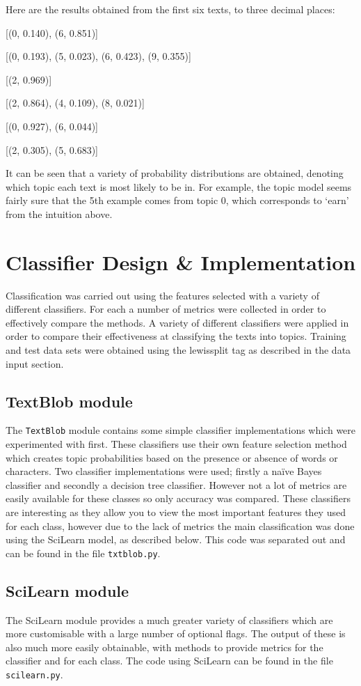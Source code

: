 \documentclass{article}
\begin{document}
Here are the results obtained from the first six texts, to three decimal places:

[(0, 0.140), (6, 0.851)]

[(0, 0.193), (5, 0.023), (6, 0.423), (9, 0.355)]

[(2, 0.969)]

[(2, 0.864), (4, 0.109), (8, 0.021)]

[(0, 0.927), (6, 0.044)]

[(2, 0.305), (5, 0.683)]

It can be seen that a variety of probability distributions are obtained, denoting which topic each text is most likely to be in. For example, the topic model seems fairly sure that the 5th example comes from topic 0, which corresponds to `earn' from the intuition above.

\section{Classifier Design \& Implementation}
Classification was carried out using the features selected with a variety of different classifiers. For each a number of metrics were collected in order to effectively compare the methods. A variety of different classifiers were applied in order to compare their effectiveness at classifying the texts into topics. Training and test data sets were obtained using the lewissplit tag as described in the data input section.

\subsection{TextBlob module}
The \verb|TextBlob| module contains some simple classifier implementations which were experimented with first. These classifiers use their own feature selection method which creates topic probabilities based on the presence or absence of words or characters. Two classifier implementations were used; firstly a na{\"i}ve Bayes classifier and secondly a decision tree classifier. However not a lot of metrics are easily available for these classes so only accuracy was compared. These classifiers are interesting as they allow you to view the most important features they used for each class, however due to the lack of metrics the main classification was done using the SciLearn model, as described below. This code was separated out and can be found in the file \verb|txtblob.py|.

\subsection{SciLearn module}
The SciLearn module provides a much greater variety of classifiers which are more customisable with a large number of optional flags. The output of these is also much more easily obtainable, with methods to provide metrics for the classifier and for each class. The code using SciLearn can be found in the file \verb|scilearn.py|.
\end{document}
